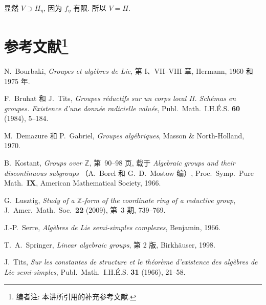 显然 \(V\supset H_\eta\), 因为 \(f_\eta\) 有限. 所以 \(V=H\). \SGAQED

\section*{参考文献\footnote{编者注: 本讲所引用的补充参考文献.}}

\begin{description}[style=multiline,leftmargin=4.8em,labelwidth=4.0em]
\item[\textup{[BLie]}]
N.~Bourbaki, \textit{Groupes et algèbres de Lie}, 第 I、VII--VIII 章, Hermann, 1960 和 1975 年.

\item[\textup{[BT84]}]
F.~Bruhat 和 J.~Tits, \textit{Groupes réductifs sur un corps local II.
Schémas en groupes. Existence d'une donnée radicielle valuée},
Publ.\ Math.\ I.H.É.S. \textbf{60} (1984), 5--184.

\item[\textup{[DG70]}]
M.~Demazure 和 P.~Gabriel, \textit{Groupes algébriques},
Masson \& North-Holland, 1970.

\item[\textup{[Ko66]}]
B.~Kostant, \textit{Groups over \(\mathbb Z\)}, 第~90--98 页, 载于
\textit{Algebraic groups and their discontinuous subgroups}
（A.~Borel 和 G.~D.~Mostow 编）, Proc.\ Symp.\ Pure Math.\
\textbf{IX}, American Mathematical Society, 1966.

\item[\textup{[Lu09]}]
G.~Lusztig, \textit{Study of a \(\mathbb Z\)-form of the coordinate
ring of a reductive group}, J.\ Amer.\ Math.\ Soc.\ \textbf{22}
(2009), 第~3 期, 739--769.

\item[\textup{[Se66]}]
J.-P.~Serre, \textit{Algèbres de Lie semi-simples complexes},
Benjamin, 1966.

\item[\textup{[Sp98]}]
T.~A.~Springer, \textit{Linear algebraic groups}, 第 2 版,
Birkhäuser, 1998.

\item[\textup{[Ti66]}]
J.~Tits, \textit{Sur les constantes de structure et le théorème
d'existence des algèbres de Lie semi-simples},
Publ.\ Math.\ I.H.É.S. \textbf{31} (1966), 21--58.
\end{description}
